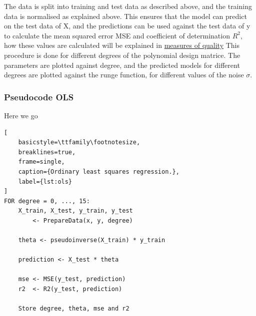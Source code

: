 \documentclass[aps,rmp,reprint,raggedbottom,amsmath,amssymb,longbibliography]{revtex4-1}
\begin{document}
The data is split into training and test data as described above, and the training data is normalised
as explained above. This ensures that the model can predict on the test data of X, and the predictions
can be used against the test data of y to calculate the mean squared error MSE and coefficient of determination $R^2$, how these values are calculated will be explained in \hyperref[sec:PF]{measures of quality}
This procedure is done for different degrees of the polynomial design matrice. The parameters are plotted against degree, and the predicted
models for different degrees are plotted against the runge function, for different values of the noise $\sigma$.
\subsubsection{Pseudocode OLS}
Here we go
\begin{lstlisting}[
    basicstyle=\ttfamily\footnotesize,
    breaklines=true,
    frame=single,
    caption={Ordinary least squares regression.},
    label={lst:ols}
]
FOR degree = 0, ..., 15:
    X_train, X_test, y_train, y_test
        <- PrepareData(x, y, degree)

    theta <- pseudoinverse(X_train) * y_train

    prediction <- X_test * theta

    mse <- MSE(y_test, prediction)
    r2  <- R2(y_test, prediction)

    Store degree, theta, mse and r2
\end{lstlisting}
\end{document}
